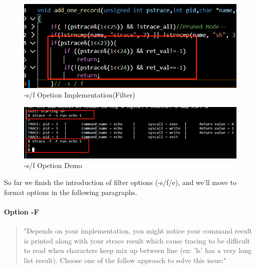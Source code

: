 \documentclass[11pt,oneside,a4paper]{article}
\begin{document}
\begin{figure}[H]
    \includegraphics[width=4.75in]{1-23.png}
    \centering
    \caption{-s/f Opetion Implementation(Filter)}
\end{figure}

\begin{figure}[H]
    \includegraphics[width=4.75in]{1-26.png}
    \centering
    \caption{-s/f Opetion Demo}
\end{figure}

So far we finish the introduction of filter options (-s/f/e), and we'll move to format 
options in the following paragraphs.

\paragraph*{Option -F}
\begin{quotation}
    "Depends on your implementation, you might notice your command result is printed along with your
strace result which cause tracing to be difficult to read when characters keep mix up between line
(ex: 'ls' has a very long list result). Choose one of the follow approach to solve this issue:"
\end{quotation}
\end{document}
